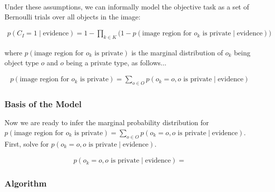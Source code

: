 \documentclass[11pt]{article}
\begin{document}
Under these assumptions, we can informally model the objective task as a set of Bernoulli trials over all objects in the image:

\begin{align}\label{eqn:task2.0}
    p(C_I = 1 \mid \textrm{evidence}) = 1 - \prod_{k \in K} \Big( 1 - p(\textrm{image region for $o_k$ is private} \mid \textrm{evidence}) \Big)
\end{align}

where $p(\textrm{image region for $o_k$ is private})$ is the marginal distribution of $o_k$ being object type $o$ and $o$ being a private type, as follows...

\begin{align}\label{eqn:task2.1}
    p(\textrm{image region for $o_k$ is private}) = \sum_{o \in O} p(o_k = o, o\textrm{ is private} \mid \textrm{evidence})    
\end{align}

\subsubsection{Basis of the Model}



Now we are ready to infer the marginal probability distribution for $p(\textrm{image region for $o_k$ is private}) = \sum_{o \in O} p(o_k = o, o\textrm{ is private} \mid \textrm{evidence})$.  First, solve for $p(o_k = o, o\textrm{ is private} \mid \textrm{evidence})$.

\begin{align*}
    p(o_k = o, o\textrm{ is private} \mid \textrm{evidence}) =
\end{align*}

\subsubsection{Algorithm}
\end{document}
